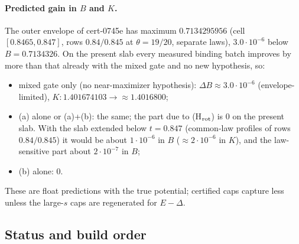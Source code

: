 \paragraph{Predicted gain in $B$ and $K$.} The outer envelope of cert-0745e has maximum $0.7134295956$ (cell $[0.8465,0.847]$, rows $0.84/0.845$ at $\theta=19/20$, separate laws),
$3.0\cdot10^{-6}$ below $B=0.7134326$. On the present slab every measured binding batch improves by more than that already with the mixed gate and no new hypothesis, so:
\begin{itemize}
\item mixed gate only (no near-maximizer hypothesis): $\Delta B\approx3.0\cdot10^{-6}$ (envelope-limited), $K:1.401674103\to\approx1.4016800$;
\item (a) alone or (a)+(b): the same; the part due to (H$_{\rm rot}$) is $0$ on the present slab. With the slab extended below $t=0.847$ (common-law profiles of rows $0.84/0.845$) it
would be about $1\cdot10^{-6}$ in $B$ ($\approx2\cdot10^{-6}$ in $K$), and the law-sensitive part about $2\cdot10^{-7}$ in $B$;
\item (b) alone: $0$.
\end{itemize}
These are float predictions with the true potential; certified caps capture less unless the large-$s$ caps are regenerated for $E-\Delta$.

\subsection{Status and build order}\label{sec:nearmax-build}

